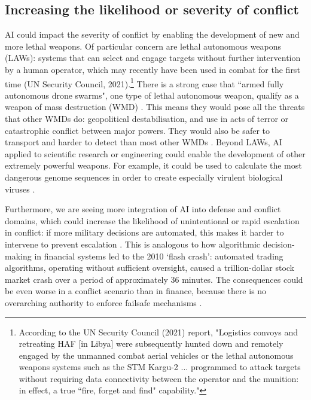 \documentclass{article}
\begin{document}
\subsection{Increasing the likelihood or severity of conflict}

AI could impact the severity of conflict by enabling the development of new and more lethal weapons. Of particular concern are lethal autonomous weapons (LAWs): systems that can select and engage targets without further intervention by a human operator, which may recently have been used in combat for the first time (UN Security Council, 2021).\footnote{According to the UN Security Council (2021) report, "Logistics convoys and retreating HAF [in Libya] were subsequently hunted down and remotely engaged by the unmanned combat aerial vehicles or the lethal autonomous weapons systems such as the STM Kargu-2 $\ldots$ programmed to attack targets without requiring data connectivity between the operator and the munition: in effect, a true ``fire, forget and find" capability."}  There is a strong case that ``armed fully autonomous drone swarms", one type of lethal autonomous weapon, qualify as a weapon of mass destruction (WMD) \citep{kallenborn_are_2020}. This means they would pose all the threats that other WMDs do: geopolitical destabilisation, and use in acts of terror or catastrophic conflict between major powers. They would also be safer to transport and harder to detect than most other WMDs \citep{aguirre_why_2020}. Beyond LAWs, AI applied to scientific research or engineering could enable the development of other extremely powerful weapons. For example, it could be used to calculate the most dangerous genome sequences in order to create especially virulent biological viruses \citep{obrien_assessing_2020,turchin_classification_2020}.

Furthermore, we are seeing more integration of AI into defense and conflict domains, which could increase the likelihood of unintentional or rapid escalation in conflict: if more military decisions are automated, this makes it harder to intervene to prevent escalation \citep{johnson_artificial_2020,deeks_machine_2018}. This is analogous to how algorithmic decision-making in financial systems led to the 2010 ‘flash crash’: automated trading algorithms, operating without sufficient oversight, caused a trillion-dollar stock market crash over a period of approximately 36 minutes. The consequences could be even worse in a conflict scenario than in finance, because there is no overarching authority to enforce failsafe mechanisms \citep{johnson_artificial_2020}.
\end{document}
